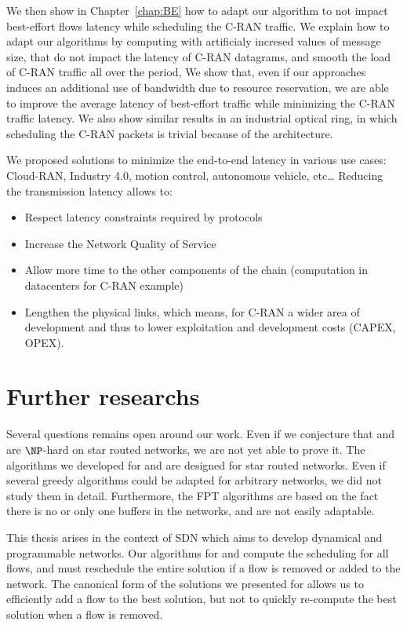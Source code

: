 We then show in Chapter~\ref{chap:BE} how to adapt our algorithm to not impact best-effort flows latency while scheduling the C-RAN traffic. We explain how to adapt our algorithms by computing with artificialy incresed values of message size, that do not impact the latency of C-RAN datagrams, and smooth the load of C-RAN traffic all over the period, 
 We show that, even if our approaches induces an additional use of bandwidth due to resource reservation, we are able to improve the average latency of best-effort traffic while minimizing the C-RAN traffic latency. We also show similar results in an industrial optical ring, in which scheduling the C-RAN packets is trivial because of the architecture.

We proposed solutions to minimize the end-to-end latency in various use cases: Cloud-RAN, Industry 4.0, motion control, autonomous vehicle, etc\ldots
Reducing the transmission latency allows to:
\begin{itemize}
	\item Respect latency constraints required by protocols
	\item Increase the Network Quality of Service 
	\item Allow more time to the other components of the chain (computation in datacenters for C-RAN example) 
	\item Lengthen the physical links, which means, for C-RAN a wider area of development and thus to lower exploitation and development costs (CAPEX, OPEX).
\end{itemize} 

\section*{Further researchs}

Several questions remains open around our work. Even if we conjecture that \pazl and \pall are $\NP$-hard on star routed networks, we are not yet able to prove it. 
The algorithms we developed for \pazl and \pall are designed for star routed networks. Even if several greedy algorithms could be adapted for arbitrary networks, we did not study them in detail. Furthermore, the FPT algorithms are based on the fact there is no or only one buffers in the networks, and are not easily adaptable.

This thesis arises in the context of SDN which aims to develop dynamical and programmable networks. Our algorithms for \pazl and \pall compute the scheduling for all flows, and must reschedule the entire solution if a flow is removed or added to the network. The canonical form of the solutions we presented for \minstra allows us to efficiently add a flow to the best solution, but not to quickly re-compute the best solution when a flow is removed.

